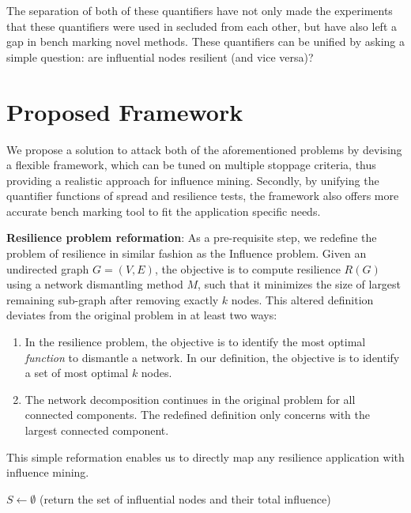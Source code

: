 		The separation of both of these quantifiers have not only made the experiments that these quantifiers were used in secluded from each other, but have also left a gap in bench marking novel methods. These quantifiers can be unified by asking a simple question: are influential nodes resilient (and vice versa)?


	\section{Proposed Framework}
	\label{sec:inf-framework-proposed-framework}
	We propose a solution to attack both of the aforementioned problems by devising a flexible framework, which can be tuned on multiple stoppage criteria, thus providing a realistic approach for influence mining. Secondly, by unifying the quantifier functions of spread and resilience tests, the framework also offers more accurate bench marking tool to fit the application specific needs.
	
	\textbf{Resilience problem reformation}:
	As a pre-requisite step, we redefine the problem of resilience in similar fashion as the Influence problem. Given an undirected graph $G=(V,E)$, the objective is to compute resilience $R(G)$ using a network dismantling method $M$, such that it minimizes the size of largest remaining sub-graph after removing exactly $k$ nodes. This altered definition deviates from the original problem in at least two ways:
		
	\begin{enumerate}
		\item In the resilience problem, the objective is to identify the most optimal \textit{function} to dismantle a network. In our definition, the objective is to identify a set of most optimal $k$ nodes.
		
		\item The network decomposition continues in the original problem for all connected components. The redefined definition only concerns with the largest connected component.
	\end{enumerate}
	
	This simple reformation enables us to directly map any resilience application with influence mining.

	\begin{algorithm}[h]
		\caption{Proposed Influence Mining framework with flexible stoppage criteria}
		\label{alg:influence-mining-framework}
		\SetAlgoLined
		$S \gets \emptyset$
		\newline
		 (return the set of influential nodes and their total influence)
	\end{algorithm}

